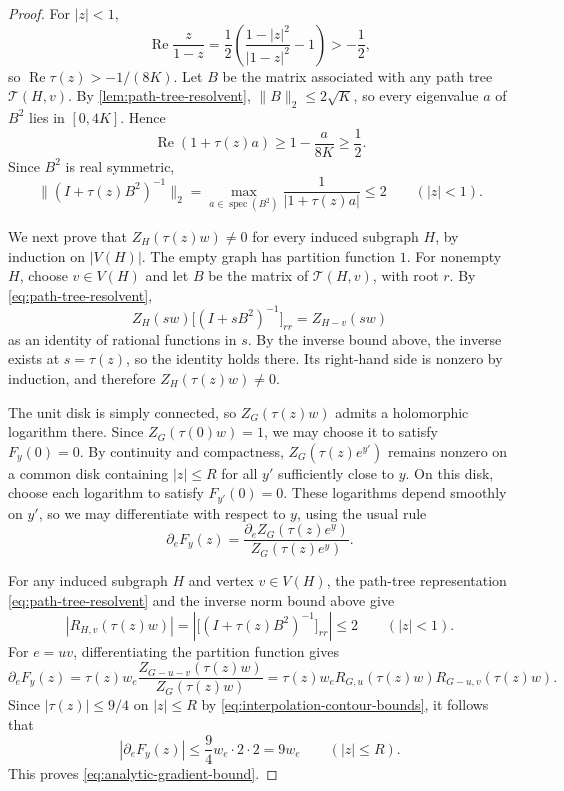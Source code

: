 \documentclass[10pt,a4paper]{amsart}
\newcommand{\norm}[1]{\lVert #1\rVert}
\begin{document}
\begin{proof}
For $|z|<1$,
\[
 \operatorname{Re}\frac{z}{1-z}
 =\frac12\left(\frac{1-|z|^2}{|1-z|^2}-1\right)>-\frac12,
\]
so $\operatorname{Re}\tau(z)>-1/(8K)$. Let $B$ be the matrix
associated with any path tree $\mathcal T(H,v)$.
By \cref{lem:path-tree-resolvent}, $\norm B_2\le2\sqrt K$,
so every eigenvalue $a$ of $B^2$ lies in $[0,4K]$. Hence
\[
 \operatorname{Re}(1+\tau(z)a)
 \ge1-\frac{a}{8K}\ge\frac12.
\]
Since $B^2$ is real symmetric,
\begin{equation*}
 \norm{(I+\tau(z)B^2)^{-1}}_2
 =\max_{a\in\operatorname{spec}(B^2)}
       \frac1{|1+\tau(z)a|}
 \le2
 \qquad(|z|<1).
\end{equation*}

We next prove that $Z_H(\tau(z)w)\ne0$ for every induced subgraph
$H$, by induction on $|V(H)|$. The empty graph has partition
function $1$. For nonempty $H$, choose $v\in V(H)$ and let $B$
be the matrix of $\mathcal T(H,v)$, with root $r$.
By \cref{eq:path-tree-resolvent},
\[
 Z_H(sw)\bigl[(I+sB^2)^{-1}\bigr]_{rr}=Z_{H-v}(sw)
\]
as an identity of rational functions in $s$. By the inverse bound above,
the inverse exists at $s=\tau(z)$, so the identity holds there.
Its right-hand side is nonzero by induction, and therefore
$Z_H(\tau(z)w)\ne0$.

The unit disk is simply connected, so $Z_G(\tau(z)w)$ admits a
holomorphic logarithm there. Since $Z_G(\tau(0)w)=1$, we may choose
it to satisfy $F_y(0)=0$. By continuity and compactness,
$Z_G(\tau(z)e^{y'})$ remains nonzero on a common disk containing
$|z|\le R$ for all $y'$ sufficiently close to $y$. On this disk,
choose each logarithm to satisfy $F_{y'}(0)=0$. These logarithms
depend smoothly on $y'$, so we may differentiate with respect
to $y$, using the usual rule
\[
 \partial_eF_y(z)
 =\frac{\partial_e Z_G(\tau(z)e^y)}{Z_G(\tau(z)e^y)}.
\]

For any induced subgraph $H$ and vertex $v\in V(H)$, the path-tree
representation \cref{eq:path-tree-resolvent} and the inverse norm bound
above give
\begin{equation*}
 |R_{H,v}(\tau(z)w)|
 =\left|\bigl[(I+\tau(z)B^2)^{-1}\bigr]_{rr}\right|
 \le2
 \qquad(|z|<1).
\end{equation*}
For $e=uv$, differentiating the partition function gives
\[
 \partial_eF_y(z)
 =\tau(z)w_e\frac{Z_{G-u-v}(\tau(z)w)}{Z_G(\tau(z)w)}
 =\tau(z)w_eR_{G,u}(\tau(z)w)R_{G-u,v}(\tau(z)w).
\]
Since $|\tau(z)|\le9/4$ on $|z|\le R$ by
\cref{eq:interpolation-contour-bounds}, it follows that
\[
 |\partial_eF_y(z)|
 \le\frac94w_e\cdot2\cdot2=9w_e
 \qquad(|z|\le R).
\]
This proves \cref{eq:analytic-gradient-bound}.


\end{proof}
\end{document}
